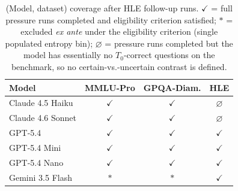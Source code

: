 \begin{table}[h]
\centering
\small
\setlength{\tabcolsep}{6pt}
\renewcommand{\arraystretch}{1.15}
\caption{(Model, dataset) coverage after HLE follow-up runs.
  $\checkmark$ = full pressure runs completed and eligibility
  criterion satisfied; $\ast$ = excluded \emph{ex ante} under the
  eligibility criterion (single populated entropy bin);
  $\varnothing$ = pressure runs completed but the model has
  essentially no $T_0$-correct questions on the benchmark, so no
  certain-vs.-uncertain contrast is defined.}
\label{tab:coverage}
\begin{tabular}{l ccc}
\toprule
\textbf{Model} & \textbf{MMLU-Pro} & \textbf{GPQA-Diam.} & \textbf{HLE} \\
\midrule
Claude 4.5 Haiku     & $\checkmark$ & $\checkmark$ & $\varnothing$ \\
Claude 4.6 Sonnet    & $\checkmark$ & $\checkmark$ & $\varnothing$ \\
GPT-5.4              & $\checkmark$ & $\checkmark$ & $\checkmark$ \\
GPT-5.4 Mini         & $\checkmark$ & $\checkmark$ & $\checkmark$ \\
GPT-5.4 Nano         & $\checkmark$ & $\checkmark$ & $\checkmark$ \\
Gemini 3.5 Flash     & $\ast$       & $\ast$       & $\checkmark$ \\
\bottomrule
\end{tabular}
\end{table}
